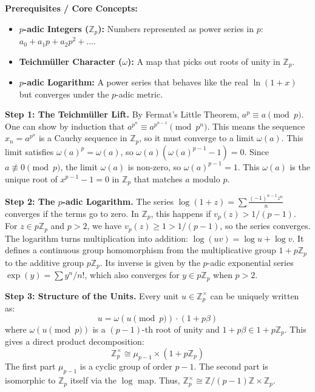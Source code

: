 \begin{solution}
\textbf{Prerequisites / Core Concepts:}
\begin{itemize}
    \item \textbf{$p$-adic Integers ($\mathbb{Z}_p$):} Numbers represented as power series in $p$: $a_0 + a_1 p + a_2 p^2 + \dots$.
    \item \textbf{Teichmüller Character ($\omega$):} A map that picks out roots of unity in $\mathbb{Z}_p$.
    \item \textbf{$p$-adic Logarithm:} A power series that behaves like the real $\ln(1+x)$ but converges under the $p$-adic metric.
\end{itemize}

\textbf{Step 1: The Teichmüller Lift.}
By Fermat's Little Theorem, $a^p \equiv a \pmod p$. One can show by induction that $a^{p^n} \equiv a^{p^{n-1}} \pmod{p^n}$.
This means the sequence $x_n = a^{p^n}$ is a Cauchy sequence in $\mathbb{Z}_p$, so it must converge to a limit $\omega(a)$.
This limit satisfies $\omega(a)^p = \omega(a)$, so $\omega(a)(\omega(a)^{p-1} - 1) = 0$. Since $a \not\equiv 0 \pmod p$, the limit $\omega(a)$ is non-zero, so $\omega(a)^{p-1} = 1$.
This $\omega(a)$ is the unique root of $x^{p-1}-1=0$ in $\mathbb{Z}_p$ that matches $a$ modulo $p$.

\textbf{Step 2: The $p$-adic Logarithm.}
The series $\log(1+z) = \sum \frac{(-1)^{n-1} z^n}{n}$ converges if the terms go to zero. In $\mathbb{Z}_p$, this happens if $v_p(z) > 1/(p-1)$.
For $z \in p\mathbb{Z}_p$ and $p > 2$, we have $v_p(z) \geq 1 > 1/(p-1)$, so the series converges.
The logarithm turns multiplication into addition: $\log(uv) = \log u + \log v$.
It defines a continuous group homomorphism from the multiplicative group $1+p\mathbb{Z}_p$ to the additive group $p\mathbb{Z}_p$.
Its inverse is given by the $p$-adic exponential series $\exp(y) = \sum y^n/n!$, which also converges for $y \in p\mathbb{Z}_p$ when $p > 2$.

\textbf{Step 3: Structure of the Units.}
Every unit $u \in \mathbb{Z}_p^\times$ can be uniquely written as:
\[ u = \omega(u \pmod p) \cdot (1 + p \beta) \]
where $\omega(u \pmod p)$ is a $(p-1)$-th root of unity and $1+p\beta \in 1+p\mathbb{Z}_p$.
This gives a direct product decomposition:
\[ \mathbb{Z}_p^\times \cong \mu_{p-1} \times (1 + p\mathbb{Z}_p) \]
The first part $\mu_{p-1}$ is a cyclic group of order $p-1$.
The second part is isomorphic to $\mathbb{Z}_p$ itself via the $\log$ map.
Thus, $\mathbb{Z}_p^\times \cong \mathbb{Z}/(p-1)\mathbb{Z} \times \mathbb{Z}_p$.
\end{solution}
